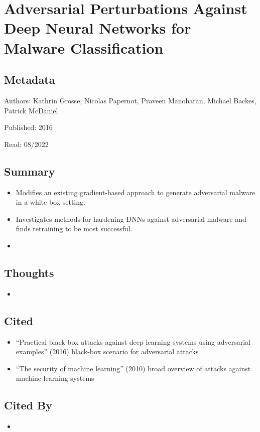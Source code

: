 \documentclass{article}
\begin{document}
\section*{Adversarial Perturbations Against Deep Neural Networks for Malware Classification}

\subsection*{Metadata}

\noindent Authors: Kathrin Grosse, Nicolas Papernot, Praveen Manoharan, Michael Backes, Patrick McDaniel

\noindent Published: 2016

\noindent Read: 08/2022

\subsection*{Summary}
\begin{itemize}
\item Modifies an existing gradient-based approach to generate adversarial malware in a white box setting.
\item Investigates methods for hardening DNNs against adversarial malware and finds retraining to be most successful.
\item 
\end{itemize}

\subsection*{Thoughts}
\begin{itemize}
\item
\end{itemize}

\subsection*{Cited}
\begin{itemize}
\item ``Practical black-box attacks against deep learning systems using adversarial examples'' (2016) black-box scenario for adversarial attacks
\item ``The security of machine learning'' (2010) broad overview of attacks against machine learning systems
\end{itemize}

\subsection*{Cited By}
\begin{itemize}
\item
\end{itemize}
\end{document}
